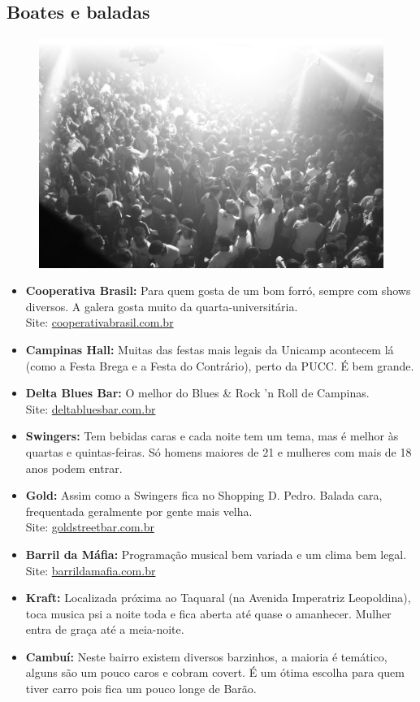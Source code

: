 \subsection{Boates e baladas}

\begin{figure}[h!]
    \centering
    \includegraphics[width=.45\textwidth]{img/barao/boate.jpg}
\end{figure}

\begin{itemize}
    \item   \textbf{Cooperativa Brasil:} Para quem gosta de um bom forró, sempre
        com shows diversos. A galera gosta muito da quarta-universitária.
        \\Site: \url{cooperativabrasil.com.br}

    \item   \textbf{Campinas Hall:} Muitas das festas mais legais da Unicamp
        acontecem lá (como a Festa Brega e a Festa do Contrário), perto da PUCC.
        É bem grande.

    \item   \textbf{Delta Blues Bar:} O melhor do Blues \& Rock 'n Roll de
        Campinas.
        \\Site: \url{deltabluesbar.com.br}

    \item   \textbf{Swingers:} Tem bebidas caras e cada noite tem um tema, mas é
        melhor às quartas e quintas-feiras. Só homens maiores de 21 e mulheres
        com mais de 18 anos podem entrar.

    \item   \textbf{Gold:} Assim como a Swingers fica no Shopping D. Pedro.
        Balada cara, frequentada geralmente por gente mais velha.
        \\Site: \url{goldstreetbar.com.br}

    \item   \textbf{Barril da Máfia:} Programação musical bem variada e um clima
        bem legal.
        \\Site: \url{barrildamafia.com.br}

    \item   \textbf{Kraft:} Localizada próxima ao Taquaral (na Avenida
        Imperatriz Leopoldina), toca musica psi a noite toda e fica aberta até
        quase o amanhecer. Mulher entra de graça até a meia-noite.

    \item   \textbf{Cambuí:} Neste bairro existem diversos barzinhos, a maioria
        é temático, alguns são um pouco caros e cobram covert. É um ótima
        escolha para quem tiver carro pois fica um pouco longe de Barão.
\end{itemize}

